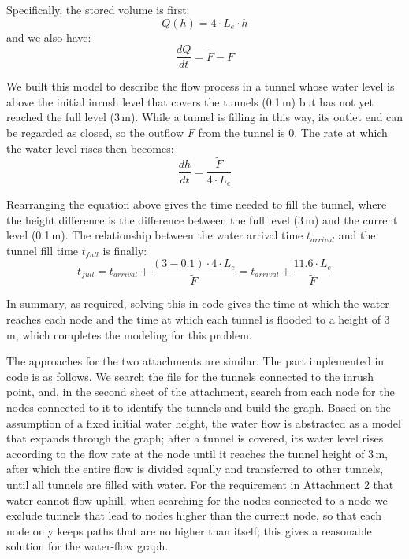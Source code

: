 \documentclass[12pt,a4paper]{article}
\makeatletter
\renewcommand{\subsubsection}{\@startsection{subsubsection}{3}{\z@}{1.5ex \@plus .5ex}{0.8ex}{\normalsize\bfseries}}
\makeatother
\begin{document}
Specifically, the stored volume is first:
\begin{equation}
  Q(h) = 4\cdot L_e \cdot h
\end{equation}
and we also have:
\begin{equation}
  \frac{dQ}{dt} = \widetilde{F} - F
\end{equation}

We built this model to describe the flow process in a tunnel whose water level is above the initial inrush level that covers the tunnels (0.1\,m) but has not yet reached the full level (3\,m). While a tunnel is filling in this way, its outlet end can be regarded as closed, so the outflow $F$ from the tunnel is 0. The rate at which the water level rises then becomes:
\begin{equation}
  \frac{dh}{dt} = \frac{\widetilde{F}}{4\cdot L_e}
\end{equation}

Rearranging the equation above gives the time needed to fill the tunnel, where the height difference is the difference between the full level (3\,m) and the current level (0.1\,m). The relationship between the water arrival time $t_{arrival}$ and the tunnel fill time $t_{full}$ is finally:
\begin{equation}
  t_{full} = t_{arrival} + \frac{(3-0.1)\cdot 4\cdot L_e}{\widetilde{F}} = t_{arrival} + \frac{11.6\cdot L_e}{\widetilde{F}}
\end{equation}

In summary, as required, solving this in code gives the time at which the water reaches each node and the time at which each tunnel is flooded to a height of 3\,m, which completes the modeling for this problem.

\subsubsection{Solution Approach}

The approaches for the two attachments are similar. The part implemented in code is as follows. We search the file for the tunnels connected to the inrush point, and, in the second sheet of the attachment, search from each node for the nodes connected to it to identify the tunnels and build the graph. Based on the assumption of a fixed initial water height, the water flow is abstracted as a model that expands through the graph; after a tunnel is covered, its water level rises according to the flow rate at the node until it reaches the tunnel height of 3\,m, after which the entire flow is divided equally and transferred to other tunnels, until all tunnels are filled with water. For the requirement in Attachment 2 that water cannot flow uphill, when searching for the nodes connected to a node we exclude tunnels that lead to nodes higher than the current node, so that each node only keeps paths that are no higher than itself; this gives a reasonable solution for the water-flow graph.
\end{document}
